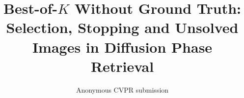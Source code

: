 \documentclass[10pt,twocolumn,letterpaper]{article}
\title{Best-of-$K$ Without Ground Truth:\\Selection, Stopping and Unsolved Images in Diffusion Phase Retrieval}
\author{Anonymous CVPR submission}
\begin{document}
\maketitle









{
    \small
    
    
}

% 
\end{document}
